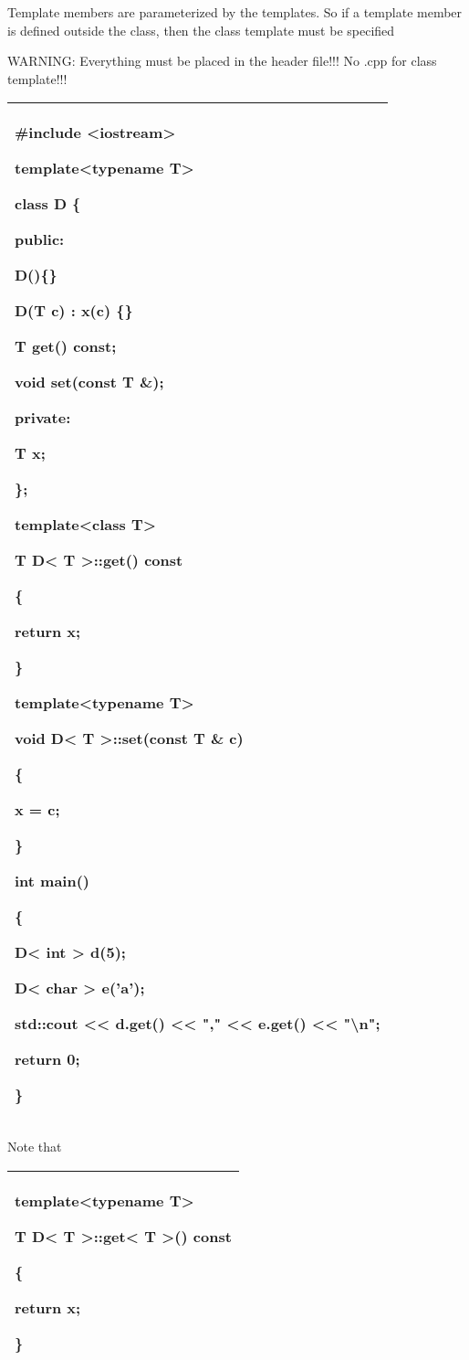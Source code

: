 \documentclass[
]{article}
\begin{document}
Template members are parameterized by the templates. So if a template
member is defined outside the class, then the class template must be
specified

WARNING: Everything must be placed in the header file!!! No .cpp for
class template!!!

\begin{longtable}[]{@{}l@{}}
\toprule
\endhead
\begin{minipage}[t]{0.97\columnwidth}\raggedright
\#include \textless iostream\textgreater{}

template\textless typename T\textgreater{}

class D \{

public:

D()\{\}

D(T c) : x(c) \{\}

T get() const;

void set(const T \&);

private:

T x;

\};

template\textless class T\textgreater{}

T D\textless{} T \textgreater::get() const

\{

return x;

\}

template\textless typename T\textgreater{}

void D\textless{} T \textgreater::set(const T \& c)

\{

x = c;

\}

int main()

\{

D\textless{} int \textgreater{} d(5);

D\textless{} char \textgreater{} e('a');

std::cout \textless\textless{} d.get() \textless\textless{} ","
\textless\textless{} e.get() \textless\textless{} "\textbackslash n";

return 0;

\}\strut
\end{minipage}\tabularnewline
\bottomrule
\end{longtable}

Note that

\begin{longtable}[]{@{}l@{}}
\toprule
\endhead
\begin{minipage}[t]{0.97\columnwidth}\raggedright
template\textless typename T\textgreater{}

T D\textless{} T \textgreater::get\textless{} T \textgreater() const

\{

return x;

\}\strut
\end{minipage}\tabularnewline
\bottomrule
\end{longtable}
\end{document}
